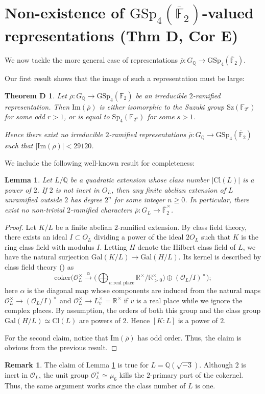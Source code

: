 \documentclass{amsart}
\newtheorem{lemma}[theorem]{Lemma}
\newtheorem*{theoremD}{Theorem D}
\theoremstyle{definition}
\newtheorem{remark}[theorem]{Remark}
\newcommand{\lra}{\longrightarrow}
\newcommand{\R}{\mathbb{R}}
\newcommand{\Q}{\mathbb{Q}}
\newcommand{\F}{\mathbb{F}}
\newcommand{\bF}{\overline{\F}}
\renewcommand{\O}{\mathcal{O}}
\newcommand{\br}{\overline{\rho}}
\newcommand{\Cl}{\mathrm{Cl}}
\newcommand{\GSp}{\mathrm{GSp}}
\newcommand{\Sp}{\mathrm{Sp}}
\newcommand{\Sz}{\mathrm{Sz}}
\newcommand{\Gal}{\mathrm{Gal}}
\newcommand{\im}{\mathrm{Im}}
\newcommand{\coker}{\mathrm{coker}}
\renewcommand{\ge}{\geqslant}
\begin{document}
\section{Non-existence of \texorpdfstring{$\GSp_4(\bF_2)$}{GSp4F2bar}-valued representations (Thm D, Cor E)}\label{GSp4nontri}

We now tackle the more general case of representations $\br:G_\Q\lra \GSp_4(\bF_2)$.

Our first result shows that the image of such a representation must be large:
\begin{theoremD}
  Let $\br:G_\Q\lra \GSp_4(\bF_2)$ be an irreducible $2$-ramified representation.
  Then $\im(\br)$ is either isomorphic to the Suzuki group $\Sz(\F_{2^r})$ for some odd $r>1$, or is equal to $\Sp_4(\F_{2^s})$ for some $s>1$.

  Hence there exist no irreducible $2$-ramified representations $\br:G_\Q\lra \GSp_4(\bF_2)$ such that $|\im(\br)|<29120$.
\end{theoremD}
We include the following well-known result for completeness:
\begin{lemma}\label{tri-char}Let $L/\Q$ be a quadratic extension whose class number $|\Cl(L)|$ is a power of $2$. If $2$ is not inert in $O_L$, then any finite abelian extension of $L$
  unramified outside $2$ has degree $2^n$ for some integer $n\ge 0$.
  In particular, there exist no non-trivial $2$-ramified characters  $\br:G_L\lra \bF^\times_2$.
\end{lemma}
\begin{proof}
  Let $K/L$ be a finite abelian $2$-ramified extension.
  By class field theory,
  there exists an ideal $I\subset O_L$ dividing a power of the ideal $2O_L$ such that $K$ is the ring class field with modulus $I$. Letting $H$ denote the
  Hilbert class field of $L$, we have the natural surjection $\Gal(K/L)\lra \Gal(H/L)$.
  Its kernel is described by class field theory (\cite[p.106, Proposition 6.114]{KKS}) as
  \begin{equation*}
    \coker\Big(\O^\times_L\stackrel{\alpha}{\lra} \Big(\bigoplus_{v:\text{real place}}\R^\times/\R^\times_{>0}\Big)\oplus (\O_L/I)^\times \Big);
  \end{equation*}
  here $\alpha$ is the diagonal map whose components are induced from
  the natural maps $\O^\times_L\lra (\O_L/I)^\times$  and
  $\O^\times_L\lra L^\times_v=\R^\times$ if $v$ is a real place while
  we ignore the complex places.
  By assumption, the orders of both this group and the class group $\Gal(H/L)\simeq \Cl(L)$ are powers of $2$.
  Hence $[K:L]$ is a power of $2$.

  For the second claim, notice that $\im(\br)$ has odd order. Thus, the claim is obvious from
  the  previous result.
\end{proof}
\begin{remark}
  The claim of Lemma \ref{tri-char} is true for $L=\Q(\sqrt{-3})$.
  Although $2$ is inert in $\O_L$, the unit group $\O^\times_L\simeq \mu_6$ kills the $2$-primary part of the cokernel. Thus, the same argument works since the class number of $L$ is one.
\end{remark}
\end{document}
